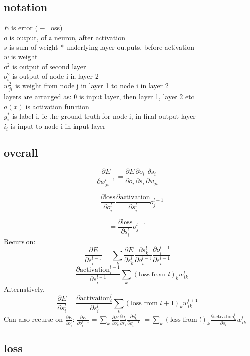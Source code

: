 \documentclass[a4paper,12pt,fleqn]{article}
\newcommand{\partialderivative}[2]{\frac{\partial #1}{\partial #2}}
\begin{document}
\subsection*{notation}

$E$ is error ($\equiv$ loss) \\
$o$ is output, of a neuron, after activation \\
$s$ is sum of weight * underlying layer outputs, before activation \\
$w$ is weight \\
$o^2$ is output of second layer \\
$o^2_i$ is output of node i in layer 2 \\
$w^2_{ji}$ is weight from node j in layer 1 to node i in layer 2\\
layers are arranged as: 0 is input layer, then layer 1, layer 2 etc \\ 
$a(x)$ is activation function\\
$y^*_i$ is label i, ie the ground truth for node i, in final output layer\\
$i_i$ is input to node i in input layer

\subsection*{overall}

\[ \partialderivative{E}{w^{l-1}_{ji}} = \partialderivative{E}{o_i} \partialderivative{o_i}{s_i} \partialderivative{s_i}{w_{ji}} \]

\[ = \partialderivative{\text{loss}}{o^l_i} \partialderivative{\text{activation}}{s^l_i} o^{l-1}_j \]

\[ = \partialderivative{\text{loss}}{s^l_i} o^{l-1}_j \]
Recursion:
\[ \partialderivative{E}{s^{l-1}_i} = \sum_k \partialderivative{E}{s^{l}_k} \partialderivative{s^{l}_k}{o^{l-1}_i} \partialderivative{o^{l-1}_i}{s^{l-1}_i}  \]
\[ = \partialderivative{\text{activation}^{l-1}_i}{s^{l-1}_i} \sum_k (\text{loss from $l$})_k w^l_{ik} \]
Alternatively, \[ \partialderivative{E}{s^{l}_i} = \partialderivative{\text{activation}^{l}_i}{s^{l}_i} \sum_k (\text{loss from $l+1$})_k w^{l+1}_{ik} \]
Can also recurse on $\partialderivative{E}{o^l_i}$: $\partialderivative{E}{o^{l-1}_i} = \sum_k \partialderivative{E}{o^{l}_k} \partialderivative{o^l_k}{s^l_k}  \partialderivative{s^l_k}{o^{l-1}_i}$ $=\sum_k (\text{loss from $l$})_k \partialderivative{\text{activation}^l_k}{s^l_k} w^l_{ik} $

\subsection*{loss}
\end{document}
